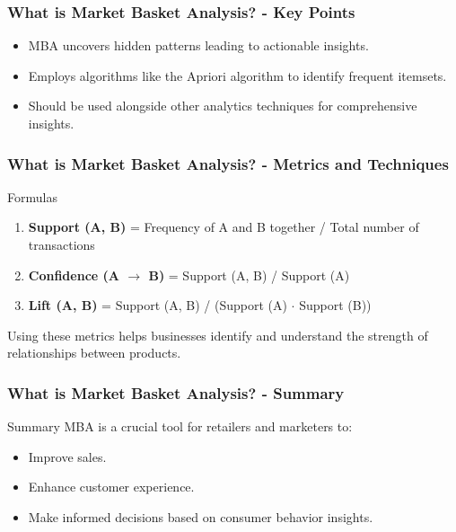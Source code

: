 \documentclass[aspectratio=169]{beamer}
\begin{document}
\begin{frame}[fragile]
    \frametitle{What is Market Basket Analysis? - Key Points}
    \begin{itemize}
        \item MBA uncovers hidden patterns leading to actionable insights.
        \item Employs algorithms like the Apriori algorithm to identify frequent itemsets.
        \item Should be used alongside other analytics techniques for comprehensive insights.
    \end{itemize}
\end{frame}

\begin{frame}[fragile]
    \frametitle{What is Market Basket Analysis? - Metrics and Techniques}
    \begin{block}{Formulas}
        \begin{enumerate}
            \item \textbf{Support (A, B)} = Frequency of A and B together / Total number of transactions
            \item \textbf{Confidence (A $\to$ B)} = Support (A, B) / Support (A)
            \item \textbf{Lift (A, B)} = Support (A, B) / (Support (A) $\cdot$ Support (B))
        \end{enumerate}
    \end{block}
    Using these metrics helps businesses identify and understand the strength of relationships between products.
\end{frame}

\begin{frame}[fragile]
    \frametitle{What is Market Basket Analysis? - Summary}
    \begin{block}{Summary}
        MBA is a crucial tool for retailers and marketers to:
        \begin{itemize}
            \item Improve sales.
            \item Enhance customer experience.
            \item Make informed decisions based on consumer behavior insights.
        \end{itemize}
    \end{block}
\end{frame}
\end{document}
